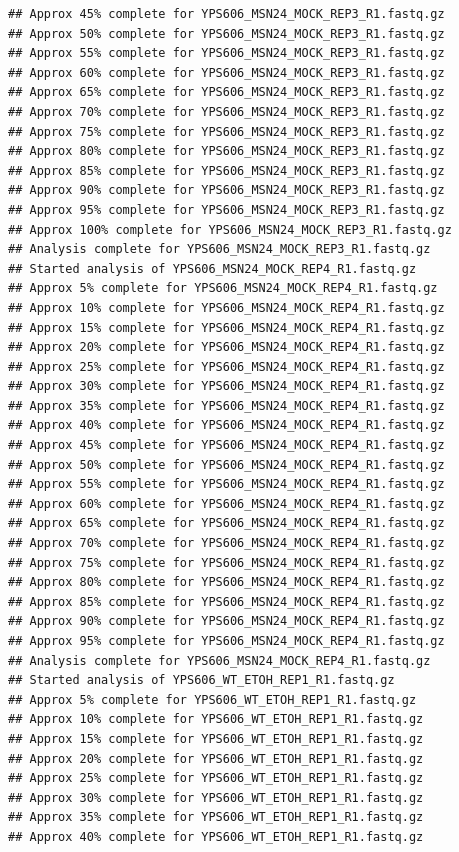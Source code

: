 \documentclass[
]{book}
\begin{document}
\begin{verbatim}
## Approx 45% complete for YPS606_MSN24_MOCK_REP3_R1.fastq.gz
## Approx 50% complete for YPS606_MSN24_MOCK_REP3_R1.fastq.gz
## Approx 55% complete for YPS606_MSN24_MOCK_REP3_R1.fastq.gz
## Approx 60% complete for YPS606_MSN24_MOCK_REP3_R1.fastq.gz
## Approx 65% complete for YPS606_MSN24_MOCK_REP3_R1.fastq.gz
## Approx 70% complete for YPS606_MSN24_MOCK_REP3_R1.fastq.gz
## Approx 75% complete for YPS606_MSN24_MOCK_REP3_R1.fastq.gz
## Approx 80% complete for YPS606_MSN24_MOCK_REP3_R1.fastq.gz
## Approx 85% complete for YPS606_MSN24_MOCK_REP3_R1.fastq.gz
## Approx 90% complete for YPS606_MSN24_MOCK_REP3_R1.fastq.gz
## Approx 95% complete for YPS606_MSN24_MOCK_REP3_R1.fastq.gz
## Approx 100% complete for YPS606_MSN24_MOCK_REP3_R1.fastq.gz
## Analysis complete for YPS606_MSN24_MOCK_REP3_R1.fastq.gz
## Started analysis of YPS606_MSN24_MOCK_REP4_R1.fastq.gz
## Approx 5% complete for YPS606_MSN24_MOCK_REP4_R1.fastq.gz
## Approx 10% complete for YPS606_MSN24_MOCK_REP4_R1.fastq.gz
## Approx 15% complete for YPS606_MSN24_MOCK_REP4_R1.fastq.gz
## Approx 20% complete for YPS606_MSN24_MOCK_REP4_R1.fastq.gz
## Approx 25% complete for YPS606_MSN24_MOCK_REP4_R1.fastq.gz
## Approx 30% complete for YPS606_MSN24_MOCK_REP4_R1.fastq.gz
## Approx 35% complete for YPS606_MSN24_MOCK_REP4_R1.fastq.gz
## Approx 40% complete for YPS606_MSN24_MOCK_REP4_R1.fastq.gz
## Approx 45% complete for YPS606_MSN24_MOCK_REP4_R1.fastq.gz
## Approx 50% complete for YPS606_MSN24_MOCK_REP4_R1.fastq.gz
## Approx 55% complete for YPS606_MSN24_MOCK_REP4_R1.fastq.gz
## Approx 60% complete for YPS606_MSN24_MOCK_REP4_R1.fastq.gz
## Approx 65% complete for YPS606_MSN24_MOCK_REP4_R1.fastq.gz
## Approx 70% complete for YPS606_MSN24_MOCK_REP4_R1.fastq.gz
## Approx 75% complete for YPS606_MSN24_MOCK_REP4_R1.fastq.gz
## Approx 80% complete for YPS606_MSN24_MOCK_REP4_R1.fastq.gz
## Approx 85% complete for YPS606_MSN24_MOCK_REP4_R1.fastq.gz
## Approx 90% complete for YPS606_MSN24_MOCK_REP4_R1.fastq.gz
## Approx 95% complete for YPS606_MSN24_MOCK_REP4_R1.fastq.gz
## Analysis complete for YPS606_MSN24_MOCK_REP4_R1.fastq.gz
## Started analysis of YPS606_WT_ETOH_REP1_R1.fastq.gz
## Approx 5% complete for YPS606_WT_ETOH_REP1_R1.fastq.gz
## Approx 10% complete for YPS606_WT_ETOH_REP1_R1.fastq.gz
## Approx 15% complete for YPS606_WT_ETOH_REP1_R1.fastq.gz
## Approx 20% complete for YPS606_WT_ETOH_REP1_R1.fastq.gz
## Approx 25% complete for YPS606_WT_ETOH_REP1_R1.fastq.gz
## Approx 30% complete for YPS606_WT_ETOH_REP1_R1.fastq.gz
## Approx 35% complete for YPS606_WT_ETOH_REP1_R1.fastq.gz
## Approx 40% complete for YPS606_WT_ETOH_REP1_R1.fastq.gz

\end{verbatim}
\end{document}
